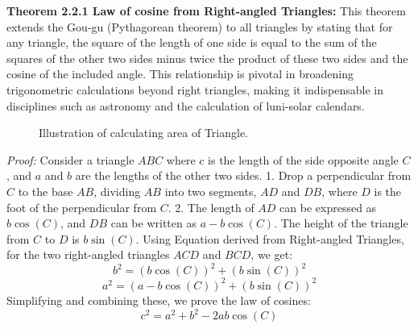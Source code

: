 \documentclass[10pt]{article}
\begin{document}
\vspace{10pt}

\textbf{Theorem 2.2.1 Law of cosine from Right-angled Triangles:} This theorem extends the Gou-gu (Pythagorean theorem) to all triangles by stating that for any triangle, the square of the length of one side is equal to the sum of the squares of the other two sides minus twice the product of these two sides and the cosine of the included angle. This relationship is pivotal in broadening trigonometric calculations beyond right triangles, making it indispensable in disciplines such as astronomy and the calculation of luni-solar calendars.

\vspace{15pt}

\begin{figure}[ht!]
\centering
{}
\caption{Illustration of calculating area of Triangle.}
\label{fig:cosine}
\end{figure}

\vspace{15pt}

\textit{Proof:} Consider a triangle $ABC$ where $c$ is the length of the side opposite angle $C$, and $a$ and $b$ are the lengths of the other two sides.
\vspace{7pt}
1. Drop a perpendicular from $C$ to the base $AB$, dividing $AB$ into two segments, $AD$ and $DB$, where $D$ is the foot of the perpendicular from $C$.
\vspace{7pt}
2. The length of $AD$ can be expressed as $b\cos(C)$, and $DB$ can be written as $a - b\cos(C)$. The height of the triangle from $C$ to $D$ is $b\sin(C)$.
\vspace{7pt}
Using Equation derived from Right-angled Triangles, for the two right-angled triangles $ACD$ and $BCD$, we get:
\[ b^2 = (b\cos(C))^2 + (b\sin(C))^2 \]
\[ a^2 = (a - b\cos(C))^2 + (b\sin(C))^2 \]
\vspace{7pt}
Simplifying and combining these, we prove the law of cosines:
\[ c^2 = a^2 + b^2 - 2ab\cos(C) \]
\end{document}
